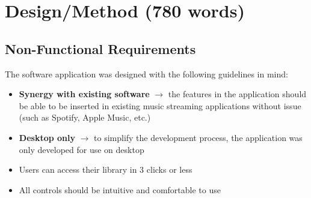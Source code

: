 \chapter{Design/Method (780 words)}

\section{Non-Functional Requirements}
The software application was designed with the following guidelines in mind:\begin{itemize}
    \item \textbf{
        Synergy with existing software
    } \(\to\) the features in the application should be able to be inserted in existing music streaming applications without issue (such as Spotify, Apple Music, etc.) %
    \item \textbf{
        Desktop only
    } \(\to\) to simplify the development process, the application was only developed for use on desktop
    \item Users can access their library in 3 clicks or less %
    \item All controls should be intuitive and comfortable to use
\end{itemize} %

